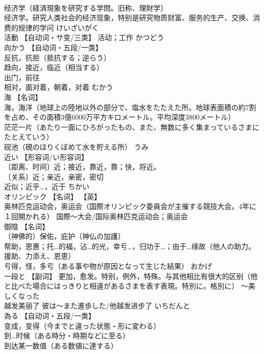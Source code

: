 \documentclass[8pt]{extreport}
\begin{document}
\begin{CJK}{UTF8}{min}
\\	经济学（経済現象を研究する学問。旧称、理財学） 
\\	经济学。研究人类社会的经济现象，特别是研究物质财富、服务的生产、交换、消费的规律的学问	けいざいがく	
\\	活動	【自动词・サ变/三类】 活动；工作	かつどう	
\\	向かう	【自动词・五段/一类】 
\\	反抗，抗拒（抵抗する；逆らう） 
\\	趋向，接近，临近（相当する） 
\\	出门，前往 
\\	相对，面对着，朝着，对着	むかう	
\\	海	【名词】 
\\	海，海洋（地球上の陸地以外の部分で、塩水をたたえた所。地球表面積の約7割を占め、その面積3億6000万平方キロメートル。平均深度3800メートル） 
\\	茫茫一片（あたり一面にひろがったもの、また、無数に多く集まっているさまにたとえていう） 
\\	砚池（硯のほりくぼめて水を貯える所）	うみ	
\\	近い	【形容词/い形容词】 
\\	〔距离、时间〕近；接近，靠近，靠；快，将近。 
\\	〔关系〕近；亲近，亲密，密切 
\\	近似；近乎…，近于	ちかい	
\\	オリンピック	【名词】 【英】
\\	奥林匹克运动会，奥运会（国際オリンピック委員会が主催する競技大会。4年に１回開かれる） 国際～大会/国际奥林匹克运动会；奥运会		
\\	御陰	【名词】 
\\	（神佛的）保佑，庇护（神仏の加護） 
\\	帮助，恩惠；托…的福，沾…的光，幸亏…，归功于…；由于…缘故（他人の助力。援助、力添え、恩恵） 
\\	亏得，怪，多亏（ある事や物が原因となって生じた結果）	おかげ	
\\	一段と	【副词】 更加，愈发。特别，例外，特殊。与其他相比有很大的区别（他と比べた場合にはっきりと相違があるさまを表す表現。特別に。格別に） ～美しくなった 
\\	越发美丽了 彼は～また進歩した/他越发进步了	いちだんと	
\\	為る	【自动词・五段/一类】 
\\	变成，变得（今までと違った状態・形に変わる） 
\\	到…时候（ある時分・時期などに至る） 
\\	到达某一数值（ある数値に達する） 

\end{CJK}
\end{document}
